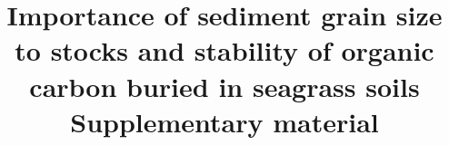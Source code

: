 %
%
%
%
%
\documentclass{report}     %
%
\usepackage[letterpaper, margin=0.9in]{geometry}
\usepackage{graphicx}
\usepackage{multirow}
\usepackage[authoryear,round]{natbib}
\usepackage{caption}
\usepackage{booktabs}
\usepackage[usenames, dvipsnames]{color}   %
\usepackage[hidelinks,linktoc=all]{hyperref}
\usepackage{textgreek}
\usepackage{mathpazo}
\usepackage{newtxtext,newtxmath,amsmath}
\usepackage[utf8]{inputenc}
\renewcommand{\arraystretch}{1.5}
\usepackage[
singlelinecheck=false 
]{caption}


\makeatletter
\renewcommand*{\thetable}{\arabic{table}}
\renewcommand*{\thefigure}{\arabic{figure}}
\let\c@table\c@figure
\makeatother 

%
%
%
%
%


\title{Importance of sediment grain size to stocks and stability of organic carbon buried in seagrass soils \bigskip Supplementary material \bigskip}

